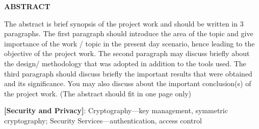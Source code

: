 \begin{center}
\Large{\textbf{ABSTRACT}}\\
\end{center}

The abstract is brief synopsis of the project work and should be written in 3  paragraphs. The first paragraph should introduce the area of the topic and give importance of the work / topic in the present day scenario, hence leading to the objective of the project work. The second paragraph may  discuss briefly about the design/ methodology that was adopted in addition to the tools used. The third paragraph should discuss briefly the important results that were obtained and its significance. You may also  discuss about  the important conclusion(s) of the project work. (The abstract should fit in one page only)

\par 
\textbf{[Security and Privacy]}: Cryptography—key management, symmetric cryptography; Security Services—authentication, access control

